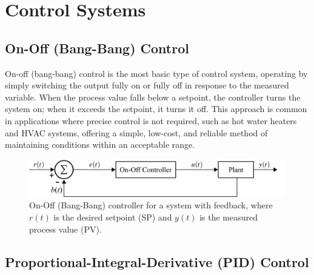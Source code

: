 \documentclass[12pt,letter]{article}
\begin{document}
	
%	

	\setcounter{section}{6}	
	\setcounter{figure}{\thesection}   
	\renewcommand\thefigure{\thesection.\arabic{figure}}
	\setcounter{equation}{\thesection}   
	\renewcommand\theequation{\thesection.\arabic{equation}}

\section{Control Systems}

\subsection{On-Off (Bang-Bang) Control}

On-off (bang-bang) control is the most basic type of control system, operating by simply switching the output fully on or fully off in response to the measured variable. When the process value falls below a setpoint, the controller turns the system on; when it exceeds the setpoint, it turns it off. This approach is common in applications where precise control is not required, such as hot water heaters and HVAC systems, offering a simple, low-cost, and reliable method of maintaining conditions within an acceptable range.


\begin{figure}[H]
	\centering
	\includegraphics[]{../figures/controller_Bang-Bang.png}
	\caption{On-Off (Bang-Bang) controller for a system with feedback, where $r(t)$ is the desired setpoint (SP) and $y(t)$ is the measured process value (PV).}
	\label{fig:controller_Bang-Bang}
\end{figure}



\subsection{Proportional-Integral-Derivative (PID) Control}
\end{document}
